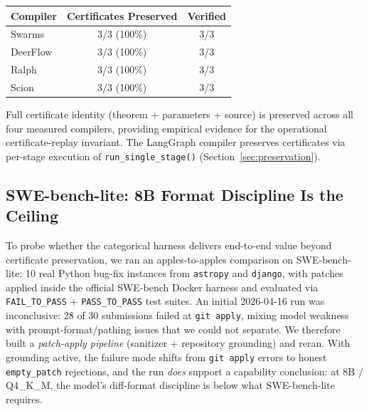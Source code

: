 \begin{center}
\small
\begin{tabular}{@{}lcc@{}}
\toprule
\textbf{Compiler} & \textbf{Certificates Preserved} & \textbf{Verified} \\
\midrule
Swarms & 3/3 (100\%) & 3/3 \\
DeerFlow & 3/3 (100\%) & 3/3 \\
Ralph & 3/3 (100\%) & 3/3 \\
Scion & 3/3 (100\%) & 3/3 \\
\bottomrule
\end{tabular}
\end{center}

Full certificate identity (theorem + parameters + source) is preserved across all four measured compilers, providing empirical evidence for the operational certificate-replay invariant. The LangGraph compiler preserves certificates via per-stage execution of \texttt{run\_single\_stage()} (Section~\ref{sec:preservation}).

\subsection{SWE-bench-lite: 8B Format Discipline Is the Ceiling}
\label{sec:swebench-phase2}

To probe whether the categorical harness delivers end-to-end value beyond certificate preservation, we ran an apples-to-apples comparison on SWE-bench-lite: 10 real Python bug-fix instances from \texttt{astropy} and \texttt{django}, with patches applied inside the official SWE-bench Docker harness and evaluated via \texttt{FAIL\_TO\_PASS} + \texttt{PASS\_TO\_PASS} test suites. An initial 2026-04-16 run was inconclusive: 28 of 30 submissions failed at \texttt{git apply}, mixing model weakness with prompt-format/pathing issues that we could not separate. We therefore built a \emph{patch-apply pipeline} (sanitizer + repository grounding) and reran. With grounding active, the failure mode shifts from \texttt{git apply} errors to honest \texttt{empty\_patch} rejections, and the run \emph{does} support a capability conclusion: at 8B / Q4\_K\_M, the model's diff-format discipline is below what SWE-bench-lite requires.


